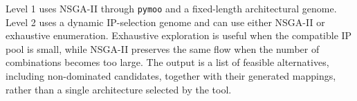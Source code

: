 Level 1 uses NSGA-II through \texttt{pymoo} and a fixed-length
architectural genome. Level 2 uses a dynamic IP-selection genome and
can use either NSGA-II or exhaustive enumeration. Exhaustive
exploration is useful when the compatible IP pool is small, while
NSGA-II preserves the same flow when the number of combinations
becomes too large. The output is a list of feasible alternatives,
including non-dominated candidates, together with their generated
mappings, rather than a single architecture selected by the tool.


